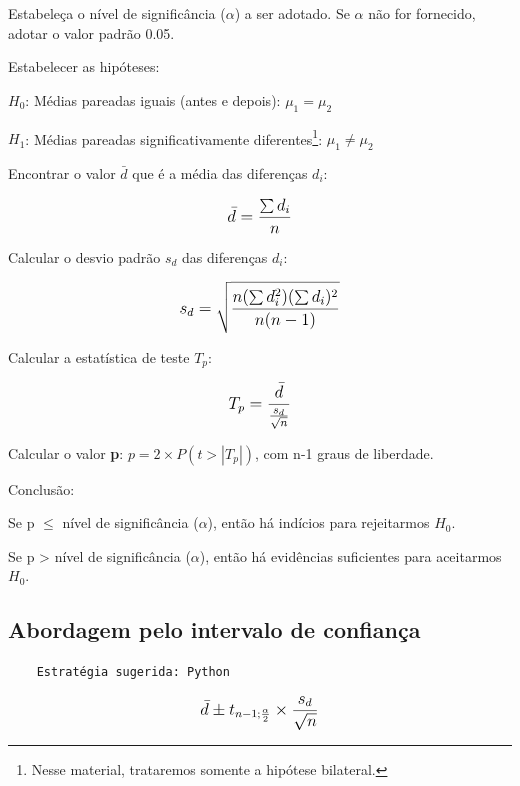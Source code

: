 \begin{alineas}
	\item Estabeleça o nível de significância (\(\alpha\)) a ser adotado. Se \(\alpha\) não for fornecido, adotar o valor padrão 0.05.
	\item Estabelecer as hipóteses:
		\begin{alineas}
			\item \(H_0\): Médias pareadas iguais (antes e depois): \(\mu_1 = \mu_2\)
			\item \(H_1\): Médias pareadas significativamente diferentes\footnote{Nesse material, trataremos somente a hipótese bilateral.}: \(\mu_1 \neq \mu_2\)
		\end{alineas}
	\item Encontrar o valor \(\bar{d}\) que é a média das diferenças \(d_i\): 

	\[\beq{ \bar{d} = \frac{\sum{d_i}}{n} }\]

	\item Calcular o desvio padrão \(s_d\) das diferenças \(d_i\):

	\[\beq{ s_d = \sqrt{\frac{n(\sum{d_i^2})(\sum{d_i})^2}{n(n-1)}} }\]	
	
	\item Calcular a estatística de teste \(T_p\):
	
	\[\beq{ T_p = \frac{\bar{d}}{ \frac{s_d}{\sqrt{n}}} }\]
	
	\item Calcular o valor \textbf{p}: \(p = 2 \times P(t>|T_p|) \), com n-1 graus de liberdade.

	\item Conclusão:
		\begin{alineas}
			\item Se p \(\leq\) nível de significância (\(\alpha\)), então há indícios para rejeitarmos \(H_0\).
			\item Se p > nível de significância (\(\alpha\)), então há evidências suficientes para aceitarmos \(H_0\).
		\end{alineas}

\subsection{Abordagem pelo intervalo de confiança}

\begin{verbatim}
	Estratégia sugerida: Python 
\end{verbatim}

\[\beq{ \bar{d} \pm t_{n-1;\frac{\alpha}{2}} \times \frac{s_d}{\sqrt{n}}  }\]
	
\end{alineas}

